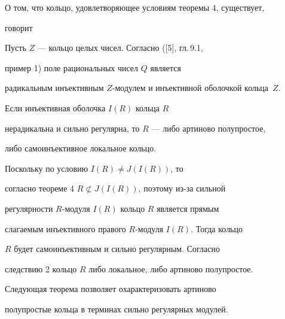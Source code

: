 О том, что кольцо, удовлетворяющее условиям теоремы 4, существует,


говорит





\begin{examnonum} Пусть $Z$ --- кольцо целых чисел. Согласно ([5], гл.\,9.1,


пример 1) поле рациональных чисел $Q$ является


радикальным инъективным $Z$-модулем и инъективной оболочкой кольца~$Z$.


\end{examnonum}





\begin{cor} Если инъективная оболочка $I(R)$ кольца $R$


нерадикальна и сильно регулярна, то $R$ --- либо артиново полупростое,


либо самоинъективное локальное кольцо.


\end{cor}





\begin{pf} Поскольку по условию $I(R) \ne J(I(R))$, то


согласно теореме 4\; $R \not\subset J(I(R))$, поэтому из-за сильной


регулярности $R$-модуля $I(R)$ кольцо $R$ является прямым


слагаемым инъективного правого $R$-модуля $I(R)$. Тогда кольцо


$R$ будет самоинъективным и сильно регулярным. Согласно


следствию 2 кольцо $R$ либо локальное, либо артиново полупростое.


\end{pf}





Следующая теорема позволяет охарактеризовать артиново


полупростые кольца в терминах сильно регулярных модулей.






